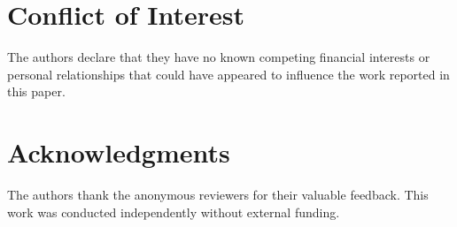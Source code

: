 \documentclass[journal]{IEEEtran}
\begin{document}
\section*{Conflict of Interest}
The authors declare that they have no known competing financial interests or personal relationships that could have appeared to influence the work reported in this paper.

\section*{Acknowledgments}
The authors thank the anonymous reviewers for their valuable feedback. This work was conducted independently without external funding.
\end{document}
